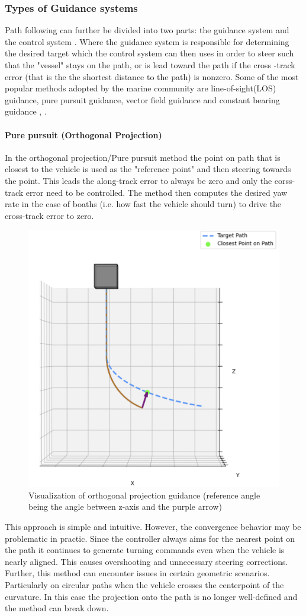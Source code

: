 \subsubsection{Types of Guidance systems}
Path following can further be divided into two parts: the guidance system and the control system \cite{qi_curve_2022}. Where the guidance system is responsible for determining the desired target which the control system can then uses in order to steer such that the "vessel" stays on the path, or is lead toward the path if the cross -track error (that is the the shortest distance to the path) is nonzero. Some of the most popular methods adopted by the marine community are line-of-sight(LOS) guidance, pure pursuit guidance, vector field guidance and constant bearing guidance \cite{qi_curve_2022}, \cite{lekkas_integral_2014}. 

\paragraph*{Pure pursuit (Orthogonal Projection)}
In the orthogonal projection/Pure pursuit method the point on path that is closest to the vehicle is used as the "reference point" and then steering towards the point. This leads the along-track error to always be zero and only the corss-track error need to be controlled. The method then computes the desired yaw rate in the case of boaths (i.e. how fast the vehicle should turn) to drive the cross-track error to zero. 
\begin{figure} [H]
    \centering
    \includegraphics[width=0.7\linewidth]{images/pythonpictures/purepursuit.png}
    \caption{Visualization of orthogonal projection guidance (reference angle being the angle between z-axis and the purple arrow)}
    \label{fig:purepursuit}
\end{figure}
This approach is simple and intuitive. However, the convergence behavior may be problematic in practic. Since the controller always aims for the nearest point on the path it continues to generate turning commands even when the vehicle is nearly aligned. This causes overshooting and unnecessary steering corrections. Further, this method can encounter issues in certain geometric scenarios. Particularly on circular paths when the vehicle crosses the centerpoint of the curvature. In this case the projection onto the path is no longer well-defined and the method can break down.

